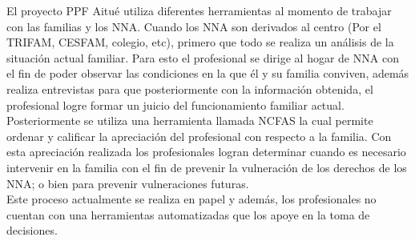 El proyecto PPF Aitué utiliza diferentes herramientas al momento de trabajar con las familias y los NNA.
Cuando los NNA son derivados al centro (Por el TRIFAM, CESFAM, colegio, etc), primero que todo se realiza un análisis de la situación actual familiar. Para esto el profesional se dirige al hogar de NNA con el fin de poder observar las condiciones en la que él y su familia conviven, además realiza entrevistas para que posteriormente con la información obtenida, el profesional logre formar un juicio del funcionamiento familiar actual.\\

Posteriormente se utiliza una herramienta llamada NCFAS la cual permite ordenar y calificar la apreciación del profesional con respecto a la familia. Con esta apreciación realizada los profesionales logran determinar cuando es necesario intervenir en la familia con el fin de prevenir la vulneración de los derechos de los NNA; o bien para prevenir vulneraciones futuras.\\
Este proceso actualmente se realiza en papel y además, los profesionales no cuentan con una herramientas automatizadas que los apoye en la toma de decisiones.